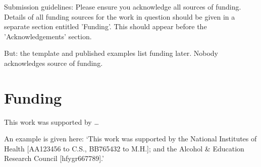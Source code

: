 \documentclass{bioinfo}
\begin{document}
Submission guidelines:
Please ensure you acknowledge all sources of funding.
Details of all funding sources for the work in question should be given in a separate section entitled 'Funding'. This should appear before the 'Acknowledgements' section.

But: the template and published examples list funding later.
Nobody acknowledges source of funding.
\vspace*{-12pt}



\section*{Funding}

This work was supported by \dots

An example is given here: ‘This work was supported by the National Institutes of Health [AA123456 to C.S., BB765432 to M.H.]; and the Alcohol \& Education Research Council [hfygr667789].’
\vspace*{-12pt}





\end{document}
